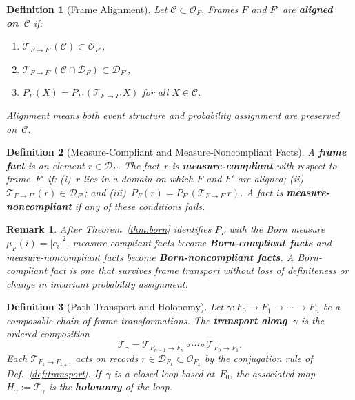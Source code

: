 \documentclass[aps,prd,twocolumn,superscriptaddress,nofootinbib,floatfix]{revtex4-2}
\newtheorem{definition}{Definition}
\newtheorem{remark}{Remark}
\begin{document}
\begin{definition}[Frame Alignment]\label{def:alignment}
Let $\mathcal{C} \subset \mathcal{O}_F$. Frames $F$ and $F'$ are \textbf{aligned on~$\mathcal{C}$} if:
\begin{enumerate}
\item $\mathcal{T}_{F \to F'}(\mathcal{C}) \subset \mathcal{O}_{F'}$,
\item $\mathcal{T}_{F \to F'}(\mathcal{C} \cap \mathcal{D}_F) \subset \mathcal{D}_{F'}$,
\item $P_F(X) = P_{F'}(\mathcal{T}_{F \to F'} X)$ for all $X \in \mathcal{C}$.
\end{enumerate}
Alignment means both event structure and probability assignment are preserved on~$\mathcal{C}$.
\end{definition}

\begin{definition}[Measure-Compliant and Measure-Noncompliant Facts]\label{def:compliance}
A \textbf{frame fact} is an element $r \in \mathcal{D}_F$. The fact~$r$ is \textbf{measure-compliant} with respect to frame~$F'$ if: (i)~$r$ lies in a domain on which $F$ and $F'$ are aligned; (ii)~$\mathcal{T}_{F \to F'}(r) \in \mathcal{D}_{F'}$; and (iii)~$P_F(r) = P_{F'}(\mathcal{T}_{F \to F'} r)$. A fact is \textbf{measure-noncompliant} if any of these conditions fails.
\end{definition}

\begin{remark}
After Theorem~\ref{thm:born} identifies $P_F$ with the Born measure $\mu_F(i) = |c_i|^2$, measure-compliant facts become \textbf{Born-compliant facts} and measure-noncompliant facts become \textbf{Born-noncompliant facts}. A Born-compliant fact is one that survives frame transport without loss of definiteness or change in invariant probability assignment.
\end{remark}

\begin{definition}[Path Transport and Holonomy]\label{def:holonomy}
Let $\gamma: F_0 \to F_1 \to \cdots \to F_n$ be a composable chain of frame transformations. The \textbf{transport along~$\gamma$} is the ordered composition
\begin{equation}
\mathcal{T}_\gamma = \mathcal{T}_{F_{n-1}\to F_n} \circ \cdots \circ \mathcal{T}_{F_0 \to F_1}.
\end{equation}
Each $\mathcal{T}_{F_k \to F_{k+1}}$ acts on records $r \in \mathcal{D}_{F_k} \subset \mathcal{O}_{F_k}$ by the conjugation rule of Def.~\ref{def:transport}. If~$\gamma$ is a closed loop based at~$F_0$, the associated map $H_\gamma := \mathcal{T}_\gamma$ is the \textbf{holonomy} of the loop.
\end{definition}
\end{document}

